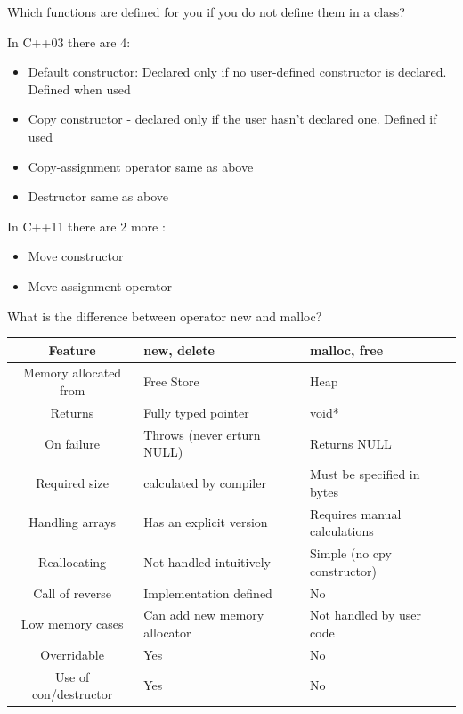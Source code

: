 \documentclass{exam}%
\begin{document}
\begin{questions}
\question Which functions are defined for you if you do not define them in a class?
\begin{solution}[.2in]
In C++03 there are 4:
\begin{itemize}
	\item Default constructor: Declared only if no user-defined constructor is declared. Defined when used
	\item Copy constructor - declared only if the user hasn't declared one. Defined if used	
	\item Copy-assignment operator same as above	
	\item Destructor same as above	
\end{itemize}	
In C++11 there are 2 more :
\begin{itemize}
	\item Move constructor
	\item Move-assignment operator	
\end{itemize}	
\end{solution}

\question What is the difference between operator new and malloc?
\begin{solution}[.2in]
\begin{center}
	\begin{tabular}{c|ll}
		\hline
		Feature & new, delete & malloc, free \\
 		\hline
		Memory allocated from & Free Store & Heap\\
 		\hline
        Returns & Fully typed pointer & void*\\
		\hline
		On failure & Throws (never erturn NULL) & Returns NULL\\
		\hline
		Required size & calculated by compiler & Must be specified in bytes\\
		\hline
		Handling arrays & Has an explicit version & Requires manual calculations\\
		\hline
		Reallocating & Not handled intuitively & Simple (no cpy constructor)\\
		\hline
		Call of reverse & Implementation defined & No\\
		\hline
		Low memory cases & Can add new memory allocator & Not handled by user code\\
		\hline
		Overridable & Yes & No\\
		\hline
		Use of con/destructor & Yes & No\\
		\hline
	\end{tabular} 
\end{center}
\end{solution}


\end{questions}
\end{document}
